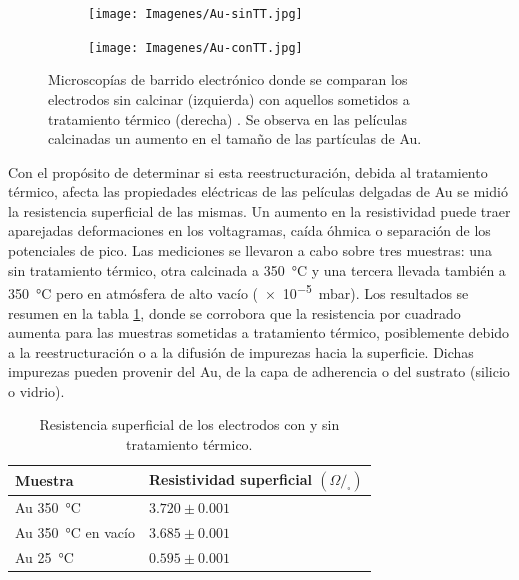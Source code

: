 			 		\begin{figure}[th]
		 	   	    \begin{subfigure}[t]{0.495\textwidth}
			       	\texttt{[image: Imagenes/Au-sinTT.jpg]}
			   		\end{subfigure}
			   		\begin{subfigure}[t]{0.495\textwidth}
			   	    \texttt{[image: Imagenes/Au-conTT.jpg]}
			   		\end{subfigure}
					 \caption[Microscopía comparativa electrodos Au]{Microscopías de barrido electrónico donde se comparan los electrodos sin calcinar (izquierda) con aquellos sometidos a tratamiento térmico (derecha) . Se observa en las películas calcinadas un aumento en el tamaño de las partículas de Au.}
					 \label{fig:Au_compTT}	
				     \end{figure}	

		     \vspace{2mm}Con el propósito de determinar si esta reestructuración, debida al tratamiento térmico,  afecta las propiedades eléctricas de las películas delgadas de Au se midió la resistencia superficial de las mismas. Un aumento en la resistividad puede traer aparejadas deformaciones en los voltagramas, caída óhmica o separación de los potenciales de pico. Las mediciones se llevaron a cabo sobre tres muestras: una sin tratamiento térmico, otra calcinada a \SI{350}{\celsius} y una tercera llevada también a \SI{350}{\celsius} pero en atmósfera de alto vacío (\SI{e-5}{\milli\bar}). Los resultados se resumen en la tabla \ref{tabla:resistencia}, donde se corrobora que la resistencia por cuadrado aumenta para las muestras sometidas a tratamiento térmico, posiblemente debido a la reestructuración o a la difusión de impurezas hacia la superficie. Dichas impurezas pueden provenir del Au, de la capa de adherencia o del sustrato (silicio o vidrio).

				\begin{table}[ht!]
			  		  \caption[Resistencia superficial de los electrodos]{Resistencia superficial de los electrodos con y sin tratamiento térmico.} 
			  		  \begin{tabular}{>{\raggedright\arraybackslash}m{4.2cm}>{\raggedright\arraybackslash}m{7.075cm}} 
			  		  \toprule
					  Muestra & Resistividad superficial $(\Omega/_{\square})$  \\ \midrule
			      	  Au \SI{350}{\celsius} 		  	& $3.720 \pm 0.001$		 \\	  
			      	  Au \SI{350}{\celsius} en vacío	& $3.685 \pm 0.001$		 \\	  
			      	  Au \SI{25}{\celsius}    	  		& $0.595 \pm 0.001$		 \\ 
			      	  \bottomrule
			    	  \end{tabular}
			    	  \label{tabla:resistencia}
			   		  \end{table}	
	
